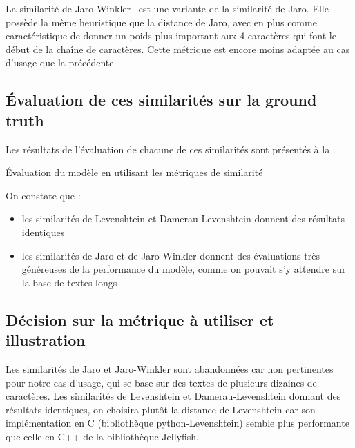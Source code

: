             La similarité de Jaro-Winkler~\cite{jaro_winkler_wiki} est une variante de la similarité de Jaro.
            Elle possède la même heuristique que la distance de Jaro, avec en plus comme caractéristique de donner un poids plus important aux 4 caractères qui font le début de la chaîne de caractères.
            Cette métrique est encore moins adaptée au cas d'usage que la précédente.

            \subsection{\'{E}valuation de ces similarités sur la ground truth}

            Les résultats de l'évaluation de chacune de ces similarités sont présentés à la .
            \begin{table}[htbp]
                \begin{center}
                
                \caption{\'{E}valuation du modèle en utilisant les métriques de similarité}
                \label{tbl:similarities_result}
                \end{center}
            \end{table}
            On constate que :
            \begin{itemize}
                \item les similarités de Levenshtein et Damerau-Levenshtein donnent des résultats identiques
                \item les similarités de Jaro et de Jaro-Winkler donnent des évaluations très généreuses de la performance du modèle, comme on pouvait s'y attendre sur la base de textes longs
            \end{itemize}

            \subsection{Décision sur la métrique à utiliser et illustration}
            
            Les similarités de Jaro et Jaro-Winkler sont abandonnées car non pertinentes pour notre cas d'usage, qui se base sur des textes de plusieurs dizaines de caractères.
            Les similarités de Levenshtein et Damerau-Levenshtein donnant des résultats identiques, on choisira plutôt la distance de Levenshtein car son implémentation en C (bibliothèque python-Levenshtein) semble plus performante que celle en C++ de la bibliothèque Jellyfish.

